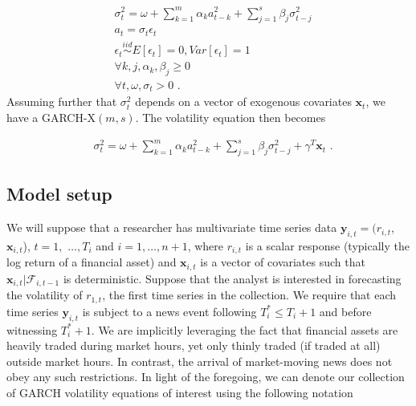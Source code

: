 \documentclass[11pt]{article}
\newcommand{\y}{\textbf{y}}
\newcommand{\x}{\textbf{x}}
\newcommand{\simiid}{\stackrel{iid}{\sim}} %
\theoremstyle{definition}
\begin{document}
\begin{align*}
&\sigma_{t}^{2} = \omega + \sum^{m}_{k=1}\alpha_{k}a^{2}_{t-k} + \sum_{j=1}^{s}\beta_{j}\sigma_{t-j}^{2}\\
&a_{t} = \sigma_{t}\epsilon_{t}\\
&\epsilon_{t} \simiid E[\epsilon_{t}]=0, Var[\epsilon_{t}] = 1\\
&\forall k,j, \alpha_{k},\beta_{j}\geq 0\\ 
&\forall t, \omega, \sigma_{t} > 0 \text { .} 
\end{align*}
Assuming further that $\sigma^{2}_{t}$ depends on a vector of exogenous covariates $\x_{t}$, we have a  GARCH-X$(m,s)$.  The volatility equation then becomes 


\begin{align}
&\sigma_{t}^{2} = \omega+ \sum^{m}_{k=1}\alpha_{k}a^{2}_{t-k} + \sum_{j=1}^{s}\beta_{j}\sigma_{t-j}^{2} + \gamma^{T}\x_{t} \text{ .}\label{GARCH-X}
\end{align}


\subsection{Model setup}
\label{modelsetup}
We will suppose that a researcher has multivariate time series data $\y_{i,t} = (r_{i,t}$, $\x_{i,t}$), $t = 1,$ $\ldots,  T_i$ and $i = 1, \ldots, n+1$, where $r_{i,t}$ is a scalar response (typically the log return of a financial asset) and  $\x_{i,t}$ is a vector of covariates such that $\x_{i,t}|\mathcal{F}_{i,t-1}$ is deterministic.  Suppose that the analyst is interested in forecasting the volatility of $r_{1,t}$, the first time series in the collection.  We require that each time series $\y_{i,t}$ is subject to a news event following $T^*_i \leq T_{i} + 1$ and before witnessing $T^*_i+1$.  We are implicitly leveraging the fact that financial assets are heavily traded during market hours, yet only thinly traded (if traded at all) outside market hours.  In contrast, the arrival of market-moving news does not obey any such restrictions.  In light of the foregoing, we can denote our collection of GARCH volatility equations of interest using the following notation
\end{document}
